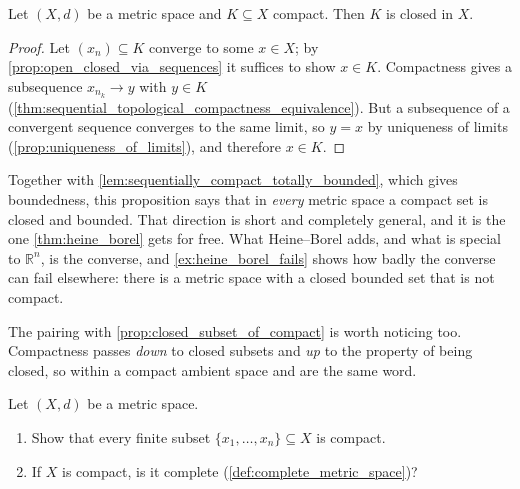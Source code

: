 \begin{proposition}
\label{prop:compact_implies_closed}
Let $(X,d)$ be a metric space and $K \subseteq X$ compact. Then $K$ is closed in $X$.
\end{proposition}

\begin{proof}
Let $(x_n) \subseteq K$ converge to some $x \in X$; by \cref{prop:open_closed_via_sequences} it
suffices to show $x \in K$. Compactness gives a subsequence $x_{n_k} \to y$ with $y \in K$
(\cref{thm:sequential_topological_compactness_equivalence}). But a subsequence of a convergent
sequence converges to the same limit, so $y = x$ by uniqueness of limits
(\cref{prop:uniqueness_of_limits}), and therefore $x \in K$.
\end{proof}

\begin{remark}
\label{rem:compact_closed_bounded_cheap_half}
Together with \cref{lem:sequentially_compact_totally_bounded}, which gives boundedness, this
proposition says that in \emph{every} metric space a compact set is closed and bounded. That
direction is short and completely general, and it is the one \cref{thm:heine_borel} gets for
free. What Heine--Borel adds, and what is special to $\mathbb{R}^n$, is the converse, and
\cref{ex:heine_borel_fails} shows how badly the converse can fail elsewhere: there is a metric
space with a closed bounded set that is not compact.

The pairing with \cref{prop:closed_subset_of_compact} is worth noticing too. Compactness passes
\emph{down} to closed subsets and \emph{up} to the property of being closed, so within a compact
ambient space  and  are the same word.
\end{remark}

\begin{exercise}
\label{ex:compact_finite_complete}
Let $(X,d)$ be a metric space.
\begin{enumerate}[label=\textbf{(\alph*)}]
  \item Show that every finite subset $\{x_1, \dots, x_n\} \subseteq X$ is compact.
  \item If $X$ is compact, is it complete (\cref{def:complete_metric_space})?
\end{enumerate}
\end{exercise}

